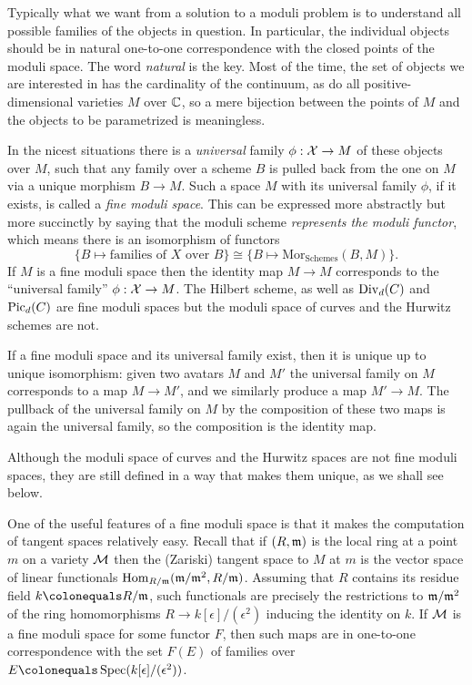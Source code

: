 Typically what we want from a solution to a
moduli problem
%
is to
understand all possible families of the objects
in question. In particular, the individual objects should be in natural
%
one-to-one correspondence with the closed points of the
moduli space.  The word \emph{natural} is the key. Most of the time,
the set of objects we are interested in has
the cardinality of the continuum,
as do all positive-dimensional varieties $M$ over ${\mathbb C}$, so a mere
bijection between the points of $M$ and the objects to be parametrized
is meaningless.

In the nicest situations there is a
\emph{universal} family
%
$\phi:
{\mathcal X}\to M$ of these objects over $M$,
such that any family over a scheme $B$  is pulled back from the one on
$M$ via a unique morphism $B\to M$.  Such a space $M$ with its universal
family $\phi$, if it exists, is called a \emph{fine moduli space}. This
%
%
can be expressed more abstractly but more succinctly by saying that the
moduli scheme \emph{represents the moduli functor}, which means there
is an isomorphism of functors
$$
\{ B \mapsto \text{families of } X \text{ over } B \} \cong \{ B\mapsto
\mathrm{{Mor}}_{\mathrm{ Schemes}}(B, M) \}.
$$
If $M$ is a fine moduli space then the identity map $M\to M$ corresponds
to the ``universal family'' $\phi: {\mathcal X} \to M$.
The Hilbert scheme, as well as $\operatorname{Div}_d(C)$ and $\operatorname{Pic}_d(C)$ are fine moduli
spaces but the moduli space of curves
and the Hurwitz schemes are not.

If a fine moduli space and its universal family exist, then it is unique
up to unique isomorphism: given two avatars $M$ and $M'$
the universal family on $M$ corresponds to a map $M\to M'$, and we
similarly produce a map $M'\to M$. The pullback of the universal family
on $M$ by the composition of these two maps is again the universal family,
so the composition is the identity map.

Although the moduli space of curves and the Hurwitz spaces are not fine
moduli spaces, they are still defined
in a way that makes them unique, as we shall see below.

\def\eps{{\epsilon}}
One of the useful features of a fine moduli space is that it makes the
computation of tangent spaces relatively easy.
%
%
Recall that if $(R,\mathfrak m)$ is the local ring at a point $m$ on a variety
${\mathcal M}$ then the (Zariski) tangent
space to $M$ at $m$ is the vector space of linear functionals
$\operatorname{Hom}_{R/\mathfrak m}(\mathfrak m/\mathfrak m^2, R/\mathfrak m)$.   Assuming that
$R$ contains its residue field $k \colonequals  R/\gm$, such functionals
are precisely the restrictions to $\mathfrak m/\mathfrak m^2$ of the ring homomorphisms
$R \to k[\eps]/(\eps^2)$ inducing the identity on $k$.
 If ${\mathcal M}$ is a fine moduli space for some functor $F$, then such maps
 are in one-to-one correspondence
with the set $F(E)$ of families over $E \colonequals
\Spec(k[\eps]/(\eps^2))$.

